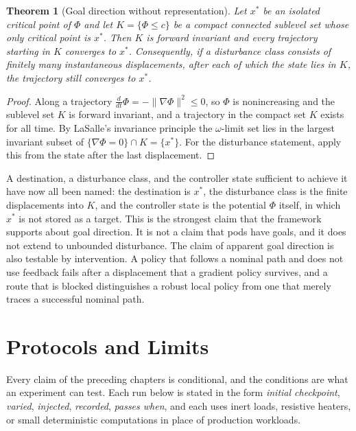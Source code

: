 \documentclass[11pt,openany]{book}
\theoremstyle{plain}
\newtheorem{theorem}{Theorem}[chapter]
\theoremstyle{definition}
\theoremstyle{remark}
\begin{document}
\begin{theorem}[Goal direction without representation]
\label{thm:lasalle}
Let $x^*$ be an isolated critical point of $\Phi$ and let $K=\{\Phi\le c\}$ be a compact connected sublevel set whose only critical point is $x^*$. Then $K$ is forward invariant and every trajectory starting in $K$ converges to $x^*$. Consequently, if a disturbance class consists of finitely many instantaneous displacements, after each of which the state lies in $K$, the trajectory still converges to $x^*$.
\end{theorem}
\begin{proof}
Along a trajectory $\frac d{dt}\Phi=-\|\nabla\Phi\|^2\le0$, so $\Phi$ is nonincreasing and the sublevel set $K$ is forward invariant, and a trajectory in the compact set $K$ exists for all time. By LaSalle's invariance principle the $\omega$-limit set lies in the largest invariant subset of $\{\nabla\Phi=0\}\cap K=\{x^*\}$. For the disturbance statement, apply this from the state after the last displacement.
\end{proof}

A destination, a disturbance class, and the controller state sufficient to achieve it have now all been named: the destination is $x^*$, the disturbance class is the finite displacements into $K$, and the controller state is the potential $\Phi$ itself, in which $x^*$ is not stored as a target. This is the strongest claim that the framework supports about goal direction. It is not a claim that pods have goals, and it does not extend to unbounded disturbance. The claim of apparent goal direction is also testable by intervention. A policy that follows a nominal path and does not use feedback fails after a displacement that a gradient policy survives, and a route that is blocked distinguishes a robust local policy from one that merely traces a successful nominal path.

\chapter{Protocols and Limits}
\label{ch:protocols}

Every claim of the preceding chapters is conditional, and the conditions are what an experiment can test. Each run below is stated in the form \emph{initial checkpoint}, \emph{varied}, \emph{injected}, \emph{recorded}, \emph{passes when}, and each uses inert loads, resistive heaters, or small deterministic computations in place of production workloads.
\end{document}
